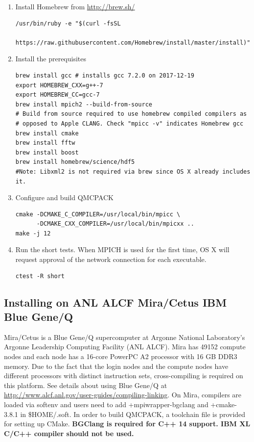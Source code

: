 \begin{enumerate}
\item Install Homebrew from \url{http://brew.sh/}
\verbatimfont{\footnotesize}%
\begin{verbatim}
/usr/bin/ruby -e "$(curl -fsSL
    https://raw.githubusercontent.com/Homebrew/install/master/install)"
\end{verbatim}

\item Install the prerequisites
\verbatimfont{\footnotesize}%
\begin{verbatim}
brew install gcc # installs gcc 7.2.0 on 2017-12-19
export HOMEBREW_CXX=g++-7
export HOMEBREW_CC=gcc-7
brew install mpich2 --build-from-source
# Build from source required to use homebrew compiled compilers as
# opposed to Apple CLANG. Check "mpicc -v" indicates Homebrew gcc
brew install cmake
brew install fftw
brew install boost
brew install homebrew/science/hdf5
#Note: Libxml2 is not required via brew since OS X already includes it.
\end{verbatim}
\item Configure and build QMCPACK
\verbatimfont{\footnotesize}%
\begin{verbatim}
cmake -DCMAKE_C_COMPILER=/usr/local/bin/mpicc \
      -DCMAKE_CXX_COMPILER=/usr/local/bin/mpicxx ..
make -j 12
\end{verbatim}
\item Run the short tests. When MPICH is used for the first time, OS
  X will request approval of the network connection for each executable.
\verbatimfont{\footnotesize}%
\begin{verbatim}
ctest -R short
\end{verbatim}
\end{enumerate}

\subsection{Installing on ANL ALCF Mira/Cetus IBM Blue Gene/Q}
\label{sec:buildbgq}
Mira/Cetus is a Blue Gene/Q supercomputer at Argonne National Laboratory's Argonne Leadership Computing Facility (ANL ALCF).
Mira has 49152 compute nodes and each node has a 16-core PowerPC A2 processor with 16 GB DDR3 memory.
Due to the fact that the login nodes and the compute nodes have different processors with distinct instruction sets,
cross-compiling is required on this platform. See details about using Blue Gene/Q at \url{http://www.alcf.anl.gov/user-guides/compiling-linking}.
On Mira, compilers are loaded via softenv and users need to add +mpiwrapper-bgclang and +cmake-3.8.1 in \$HOME/.soft.
In order to build QMCPACK, a toolchain file is provided for setting up CMake.
\textbf{BGClang is required for C++ 14 support. IBM XL C/C++ compiler should not be used.}

